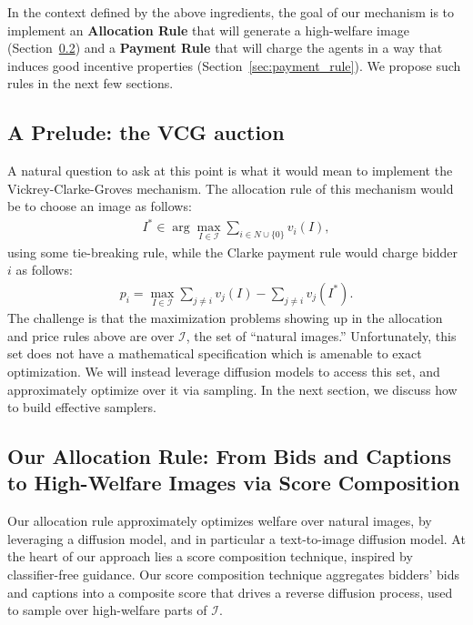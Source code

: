 \documentclass[format=acmsmall, review=false]{acmart}
\begin{document}
\medskip \noindent In the context defined by the above ingredients, the goal of our mechanism is to implement an \textbf{Allocation Rule} that will generate a high-welfare image (Section~\ref{sec:allocation_rule}) and a \textbf{Payment Rule} that will charge the agents in a way that induces good incentive properties (Section~\ref{sec:payment_rule}). We propose such rules in the next few sections. 

\subsection{A Prelude: the VCG auction}
\label{sec:prelude}

A natural question to ask at this point is what it would mean to implement the Vickrey-Clarke-Groves mechanism. The allocation rule of this mechanism would be to choose an image as follows:
\begin{align}
    I^* \in \arg\max_{I \in \mathcal{I}}\sum_{i \in N \cup \{0\}} v_i(I), \label{eq: welfare optimal allocation}
\end{align}
using some tie-breaking rule, while the Clarke payment rule would charge bidder $i$ as follows:
\begin{align}
    p_i =  \max_{I \in \mathcal{I}}\sum_{j \neq i} v_j(I) - \sum_{j \neq i} v_j(I^*). \label{eq: Clarke payment rule}
\end{align}
The challenge is that the maximization problems showing up in the allocation and price rules above are over $\mathcal{I}$, the set of ``natural images.'' Unfortunately, this set does not have a mathematical specification which is amenable to exact optimization. We will instead leverage diffusion models to access this set, and approximately optimize over it via sampling. In the next section, we discuss how to build effective samplers. 

\subsection{Our Allocation Rule: From Bids and Captions to High-Welfare Images via Score Composition}
\label{sec:allocation_rule}

Our allocation rule approximately optimizes welfare over natural images, by leveraging a diffusion model, and in particular a text-to-image diffusion model. At the heart of our approach lies a score composition technique, inspired by classifier-free guidance. Our score composition technique aggregates bidders' bids and captions into a composite score that drives a reverse diffusion process, used to sample over high-welfare parts of $\mathcal{I}$.
\end{document}

